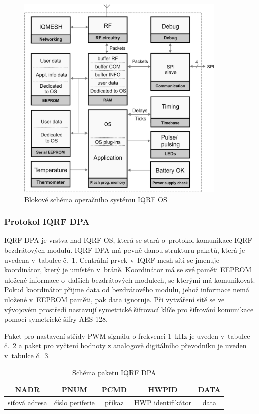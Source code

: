 \documentclass[12pt,a4paper]{article}
\begin{document}
\begin{figure}[H]
\centering
\label{fig:foto/iqrf-os}
\includegraphics[width = 100mm]{../img/iqrf/os-blokove-schema.png}
\caption{Blokové schéma operačního systému IQRF OS}
\end{figure}

\newpage

\subsubsection{Protokol IQRF DPA}

IQRF DPA\cite{iqrf/dpa} je vrstva nad IQRF OS, která se stará o~protokol komunikace IQRF bezdrátových modulů. IQRF DPA má pevně danou strukturu paketů, která je uvedena v~tabulce č.~1. Centrální prvek v~IQRF mesh síti se jmenuje koordinátor, který je umístěn v~bráně. Koordinátor má se své paměti EEPROM uložené informace o~dalších bezdrátových modulech, se kterými má komunikovat. Pokud koordinátor přijme data od bezdrátového modulu, jehož informace nemá uložené v~EEPROM paměti, pak data ignoruje. Při vytváření sítě se ve vývojovém prostředí nastavují symetrické šifrovací klíče pro šifrování komunikace pomocí symetrické šifry AES-128.

Paket pro nastavení střídy PWM signálu o frekvenci 1~kHz je uveden v~tabulce č.~2 a paket pro vyčtení hodnoty z analogově digitálního převodníku je uveden v~tabulce č.~3.

\begin{table}[H]
\centering
\begin{tabular}{|c|c|c|c|c|}
\hline
NADR & PNUM & PCMD & HWPID & DATA \\
\hline
siťová adresa & číslo periferie & příkaz & HWP\index[zkr]{HWP!Hardware profile|textit} identifikátor & data \\
\hline
\end{tabular}
\caption{Schéma paketu IQRF DPA}\label{table:iqrf/dpa}
\end{table}
\end{document}
